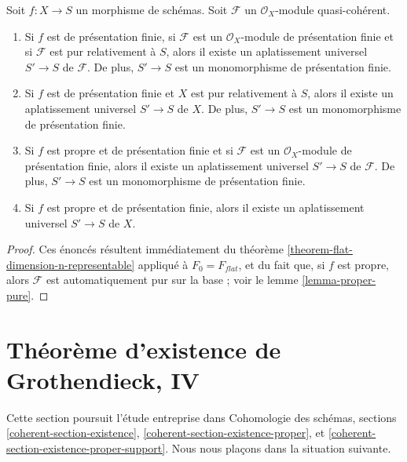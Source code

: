 \begin{lemma}
\label{lemma-when-universal-flattening}
Soit $f : X \to S$ un morphisme de schémas.
Soit $\mathcal{F}$ un $\mathcal{O}_X$-module quasi-cohérent.
\begin{enumerate}
\item Si $f$ est de présentation finie, si $\mathcal{F}$ est un
$\mathcal{O}_X$-module de présentation finie et si $\mathcal{F}$ est
pur relativement à $S$, alors il existe un aplatissement universel
$S' \to S$ de $\mathcal{F}$. De plus, $S' \to S$ est un monomorphisme
de présentation finie.
\item Si $f$ est de présentation finie et $X$ est pur relativement à $S$,
alors il existe un aplatissement universel $S' \to S$ de $X$.
De plus, $S' \to S$ est un monomorphisme de présentation finie.
\item Si $f$ est propre et de présentation finie et si $\mathcal{F}$ est un
$\mathcal{O}_X$-module de présentation finie, alors il existe un
aplatissement universel $S' \to S$ de $\mathcal{F}$. De plus, $S' \to S$ est
un monomorphisme de présentation finie.
\item Si $f$ est propre et de présentation finie,
alors il existe un aplatissement universel $S' \to S$ de $X$.
\end{enumerate}
\end{lemma}

\begin{proof}
Ces énoncés résultent immédiatement du
théorème \ref{theorem-flat-dimension-n-representable}
appliqué à $F_0 = F_{flat}$,
et du fait que, si $f$ est propre, alors $\mathcal{F}$ est automatiquement
pur sur la base ; voir le
lemme \ref{lemma-proper-pure}.
\end{proof}







\section{Théorème d'existence de Grothendieck, IV}
\label{section-existence}

\noindent
Cette section poursuit l'étude entreprise dans
Cohomologie des schémas, sections \ref{coherent-section-existence},
\ref{coherent-section-existence-proper}, et
\ref{coherent-section-existence-proper-support}.
Nous nous plaçons dans la situation suivante.

